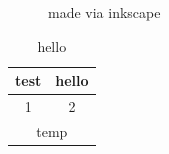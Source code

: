 \documentclass[twoside,f1]{HsH-report}
\begin{document}
	\makeatletter

	\begin{figure}
		\graphicspath{{svg/build/}} %
		
		\caption{made via inkscape}
	\end{figure}

	\begin{table}
		\caption{hello}
		\begin{tabular}{c|c}
			test & hello \\\hline\hline
			1 & 2 \\
			\multicolumn{2}{|c|}{temp}
		\end{tabular}
	\end{table}

\printbibliography
\listoffigures
\end{document}
